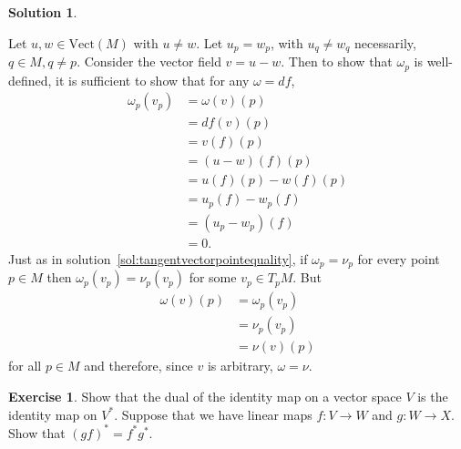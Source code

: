 \documentclass[11pt, a4paper]{article}
\theoremstyle{definition}
\newtheorem{ex}{Exercise}[part]
\newtheorem{sol}{Solution}[part]
\begin{document}
\begin{sol}\label{sol:welldefined1forms}

Let $u, w \in \text{Vect}(M)$ with $u \neq w$. Let $u_p = w_p$, with $u_q \neq w_q$ necessarily, $q \in M, q \neq p$.
Consider the vector field $v = u - w$. Then to show that $\omega_p$ is well-defined, it is sufficient to show that for any $\omega = df$,
\begin{align*}
    \omega_p(v_p) &= \omega(v)(p) \\
                  &= df(v)(p) \\
                  &= v(f)(p) \\
                  &= (u - w)(f)(p) \\
                  &= u(f)(p) - w(f)(p) \\
                  &= u_p(f) - w_p(f) \\
                  &= (u_p - w_p)(f) \\
                  &= 0.
\end{align*}
Just as in solution~\ref{sol:tangentvectorpointequality}, if $\omega_p = \nu_p$ for every point $p \in M$ then $\omega_p(v_p) = \nu_p(v_p)$ for some $v_p \in T_p M$. But
\begin{align*}
\omega (v)(p) &= \omega_p(v_p) \\
              &= \nu_p(v_p) \\
              &= \nu (v)(p)
\end{align*}
for all $p \in M$ and therefore, since $v$ is arbitrary, $\omega = \nu$.

\end{sol}

\begin{ex}

Show that the dual of the identity map on a vector space $V$ is the identity map on $V^*$.
Suppose that we have linear maps $f: V \to W$ and $g: W \to X$. Show that ${(gf)}^* = f^* g^*$.

\end{ex}
\end{document}
